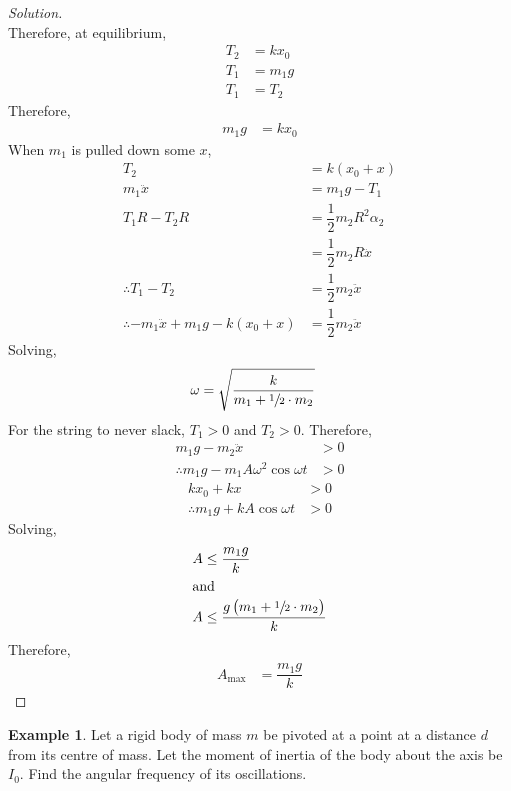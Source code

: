 \documentclass[fleqn, a4paper, 12pt]{article}
\theoremstyle{definition}
\newtheorem{example}{Example}
\theoremstyle{theorem}
\newenvironment{solution}
{\begin{proof}[Solution]\let\qed\relax}
	{\end{proof}}
\begin{document}
\begin{solution}
\\
	Therefore, at equilibrium,
	\begin{align*}
		T_2 &= k x_0\\
		T_1 &= m_1 g\\
		T_1 &= T_2
	\end{align*}
	Therefore,
	\begin{align*}
		m_1 g &= k x_0
	\end{align*}
	When $m_1$ is pulled down some $x$,
	\begin{align*}
		T_2 &= k (x_0 + x)\\
		m_1 \ddot{x} &= m_1 g - T_1\\
		T_1 R - T_2 R &= \dfrac{1}{2} m_2 R^2 \alpha_2\\
		&= \dfrac{1}{2} m_2 R \ddot{x}\\
		\therefore T_1 - T_2 &= \dfrac{1}{2} m_2 \ddot{x}\\
		\therefore -m_1 \ddot{x} + m_1 g - k (x_0 + x) &= \dfrac{1}{2} m_2 \ddot{x}
	\end{align*}
	Solving, 
	\begin{align*}
		\omega &= \sqrt{\dfrac{k}{m_1 + \sfrac{1}{2} \cdot m_2}}
	\end{align*}
	For the string to never slack, $T_1 > 0$ and $T_2 > 0$. Therefore,
	\begin{align*}
		m_1 g - m_2 \ddot{x} &> 0\\
		\therefore m_1 g - m_1 A \omega^2 \cos \omega t &> 0
	\end{align*}
	\begin{align*}
		k x_0 + k x &> 0\\
		\therefore m_1 g + k A \cos \omega t &> 0
	\end{align*}
	Solving, 
	\begin{align*}
		A &\leq \dfrac{m_1 g}{k}\\
		\intertext{and}
		A &\leq \dfrac{g \left( m_1 + \sfrac{1}{2} \cdot m_2 \right)}{k}
	\end{align*}
	Therefore,
	\begin{align*}
		A_{\text{max}} &= \dfrac{m_1 g}{k}
	\end{align*}
\end{solution}

\begin{example}
	Let a rigid body of mass $m$ be pivoted at a point at a distance $d$ from its centre of mass. Let the moment of inertia of the body about the axis be $I_0$. Find the angular frequency of its oscillations.
\end{example}
\end{document}

